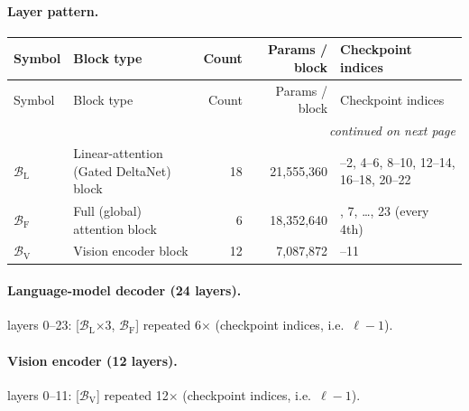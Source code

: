 \documentclass[10pt,a4paper]{article}
\theoremstyle{definition}
\begin{document}
\paragraph{Layer pattern.}
\begin{longtable}{l>{\raggedright\arraybackslash}p{5.6cm}rr>{\raggedright\arraybackslash}p{4.4cm}}
\toprule
Symbol & Block type & Count & Params / block & Checkpoint indices \\
\midrule
\endfirsthead
\toprule
Symbol & Block type & Count & Params / block & Checkpoint indices \\
\midrule
\endhead
\midrule \multicolumn{5}{r}{\textit{continued on next page}} \\
\endfoot
\bottomrule
\endlastfoot
$\mathcal{B}_{\mathrm{L}}$ & Linear-attention (Gated DeltaNet) block & 18 & 21,555,360 & 0--2, 4--6, 8--10, 12--14, 16--18, 20--22 \\
$\mathcal{B}_{\mathrm{F}}$ & Full (global) attention block & 6 & 18,352,640 & 3, 7, \ldots, 23 (every 4th) \\
$\mathcal{B}_{\mathrm{V}}$ & Vision encoder block & 12 & 7,087,872 & 0--11 \\
\end{longtable}
\paragraph{Language-model decoder (24 layers).} 
layers 0--23: [$\mathcal{B}_{\mathrm{L}}$$\times3$, $\mathcal{B}_{\mathrm{F}}$] repeated 6$\times$ (checkpoint indices, i.e.\ $\ell-1$).
\paragraph{Vision encoder (12 layers).} 
layers 0--11: [$\mathcal{B}_{\mathrm{V}}$] repeated 12$\times$ (checkpoint indices, i.e.\ $\ell-1$).
\end{document}
